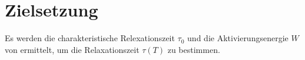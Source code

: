\section{Zielsetzung}
\label{sec:Zielsetzung}

Es werden die charakteristische Relexationszeit $\tau_0$ und die Aktivierungsenergie $W$ von %
ermittelt, um die Relaxationszeit $\tau\left(T\right)$ zu bestimmen.